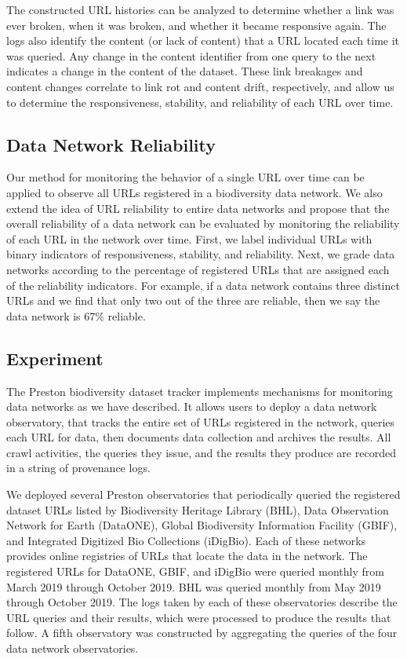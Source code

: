 The constructed URL histories can be analyzed to determine whether a link was ever broken, when it was broken, and whether it became responsive again. The logs also identify the content (or lack of content) that a URL located each time it was queried. Any change in the content identifier from one query to the next indicates a change in the content of the dataset. These link breakages and content changes correlate to link rot and content drift, respectively, and allow us to determine the responsiveness, stability, and reliability of each URL over time.

\subsection*{Data Network Reliability}
Our method for monitoring the behavior of a single URL over time can be applied to observe all URLs registered in a biodiversity data network. We also extend the idea of URL reliability to entire data networks and propose that the overall reliability of a data network can be evaluated by monitoring the reliability of each URL in the network over time. First, we label individual URLs with binary indicators of responsiveness, stability, and reliability. Next, we grade data networks according to the percentage of registered URLs that are assigned each of the reliability indicators. For example, if a data network contains three distinct URLs and we find that only two out of the three are reliable, then we say the data network is 67\% reliable.

\subsection*{Experiment}
The Preston biodiversity dataset tracker \citep{jorrit_poelen_2018_1410543} implements mechanisms for monitoring data networks as we have described. It allows users to deploy a data network observatory, that tracks the entire set of URLs registered in the network, queries each URL for data, then documents data collection and archives the results. All crawl activities, the queries they issue, and the results they produce are recorded in a string of provenance logs.

We deployed several Preston observatories that periodically queried the registered dataset URLs listed by Biodiversity Heritage Library (BHL), Data Observation Network for Earth (DataONE), Global Biodiversity Information Facility (GBIF), and Integrated Digitized Bio Collections (iDigBio). Each of these networks provides online registries of URLs that locate the data in the network. The registered URLs for DataONE, GBIF, and iDigBio were queried monthly from March 2019 through October 2019. BHL was queried monthly from May 2019 through October 2019. The logs taken by each of these observatories describe the URL queries and their results, which were processed to produce the results that follow. A fifth observatory was constructed by aggregating the queries of the four data network observatories.

